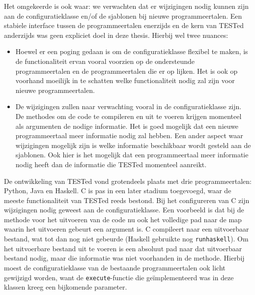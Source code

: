 Het omgekeerde is ook waar: we verwachten dat er wijzigingen nodig kunnen zijn aan de configuratieklasse en/of de sjablonen bij nieuwe programmeertalen.
Een stabiele interface tussen de programmeertalen enerzijds en de kern van TESTed anderzijds was geen expliciet doel in deze thesis.
Hierbij wel twee nuances:

\begin{itemize}
    \item Hoewel er een poging gedaan is om de configuratieklasse flexibel te maken, is de functionaliteit ervan vooral voorzien op de ondersteunde programmeertalen en de programmeertalen die er op lijken.
    Het is ook op voorhand moeilijk in te schatten welke functionaliteit nodig zal zijn voor nieuwe programmeertalen.
    \item De wijzigingen zullen naar verwachting vooral in de configuratieklasse zijn.
    De methodes om de code te compileren en uit te voeren krijgen momenteel als argumenten de nodige informatie.
    Het is goed mogelijk dat een nieuwe programmeertaal meer informatie nodig zal hebben.
    Een ander aspect waar wijzigingen mogelijk zijn is welke informatie beschikbaar wordt gesteld aan de sjablonen.
    Ook hier is het mogelijk dat een programmeertaal meer informatie nodig heeft dan de informatie die TESTed momenteel aanreikt.
\end{itemize}

De ontwikkeling van TESTed vond grotendeels plaats met drie programmeertalen: Python, Java en Haskell.
C is pas in een later stadium toegevoegd, waar de meeste functionaliteit van TESTed reeds bestond.
Bij het configureren van C zijn wijzigingen nodig geweest aan de configuratieklasse.
Een voorbeeld is dat bij de methode voor het uitvoeren van de code nu ook het volledige pad naar de map waarin het uitvoeren gebeurt een argument is.
C compileert naar een uitvoerbaar bestand, wat tot dan nog niet gebeurde (Haskell gebruikte nog \texttt{runhaskell}).
Om het uitvoerbare bestand uit te voeren is een absoluut pad naar dat uitvoerbaar bestand nodig, maar die informatie was niet voorhanden in de methode.
Hierbij moest de configuratieklasse van de bestaande programmeertalen ook licht gewijzigd worden, want de \texttt{execute}-functie die geïmplementeerd was in deze klassen kreeg een bijkomende parameter.
